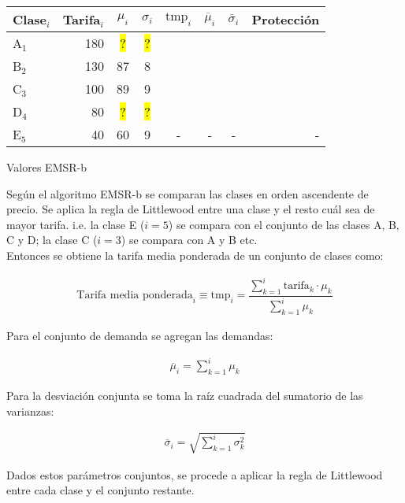 \documentclass[12pt]{article}
\begin{document}
\begin{adjustwidth}{-2.5 cm}{-2.5 cm}\centering
\begin{threeparttable}[!htb]

\begin{tabular}{lrcccccr}\toprule
Clase$_i$ & Tarifa$_i$ & $\mu_i$ &$\sigma_i$ & $\text{tmp}_i$ & $\overline{\mu}_i$ & $\overline{\sigma}_i$ & Protección\\\midrule
A$_1$ & 180 & \hl{ ? } &\hl{ ? } & & & & \\
B$_2$ & 130 & 87 &8 & & & & \\
C$_3$ & 100 & 89 &9 & & & & \\
D$_4$ & 80 & \hl{ ? } &\hl{ ? } & & & & \\
E$_5$ & 40 & 60 &9 & - & - & - & -\\
\bottomrule
\end{tabular}

\caption{Valores EMSR-b}\label{tab:emsr}
\end{threeparttable}

\end{adjustwidth}


Según el algoritmo EMSR-b se comparan las clases en orden ascendente de precio. Se aplica la regla de Littlewood entre una clase y el resto cuál sea de mayor tarifa.
i.e. la clase E ($i = 5$) se compara con el conjunto de las clases A, B, C y D; la clase C ($i = 3$) se compara con A y B etc.\\


Entonces se obtiene la tarifa media ponderada de un conjunto de clases como:

\begin{align}
\text{Tarifa media ponderada}_i \equiv \text{tmp}_i = \dfrac{\sum_{k=1}^{i} \text{tarifa}_k \cdot \mu_k}{\sum_{k=1}^{i} \mu_k}
\end{align}

Para el conjunto de demanda se agregan las demandas:

\begin{align}
\overline{\mu}_i = \sum_{k=1}^{i} \mu_k
\end{align}

Para la desviación conjunta se toma la raíz cuadrada del sumatorio de las varianzas:

\begin{align}
\overline{\sigma}_i = \sqrt{\sum_{k=1}^i \sigma_k^2}
\end{align}


Dados estos parámetros conjuntos, se procede a aplicar la regla de Littlewood entre cada clase y el conjunto restante.
\end{document}
